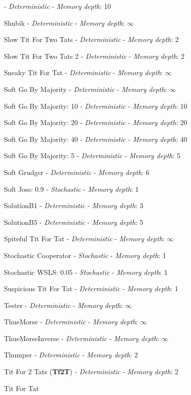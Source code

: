  - \textit{Deterministic} - \textit{Memory depth}: 10\item Shubik
 - \textit{Deterministic} - \textit{Memory depth}: \(\infty\)\item Slow Tit For Two Tats
 - \textit{Deterministic} - \textit{Memory depth}: 2\item Slow Tit For Two Tats 2
 - \textit{Deterministic} - \textit{Memory depth}: 2\item Sneaky Tit For Tat
 - \textit{Deterministic} - \textit{Memory depth}: \(\infty\)\item Soft Go By Majority
 - \textit{Deterministic} - \textit{Memory depth}: \(\infty\)\item Soft Go By Majority: 10
 - \textit{Deterministic} - \textit{Memory depth}: 10\item Soft Go By Majority: 20
 - \textit{Deterministic} - \textit{Memory depth}: 20\item Soft Go By Majority: 40
 - \textit{Deterministic} - \textit{Memory depth}: 40\item Soft Go By Majority: 5
 - \textit{Deterministic} - \textit{Memory depth}: 5\item Soft Grudger
 - \textit{Deterministic} - \textit{Memory depth}: 6\item Soft Joss: 0.9
 - \textit{Stochastic} - \textit{Memory depth}: 1\item SolutionB1
 - \textit{Deterministic} - \textit{Memory depth}: 3\item SolutionB5
 - \textit{Deterministic} - \textit{Memory depth}: 5\item Spiteful Tit For Tat
 - \textit{Deterministic} - \textit{Memory depth}: \(\infty\)\item Stochastic Cooperator
 - \textit{Stochastic} - \textit{Memory depth}: 1\item Stochastic WSLS: 0.05
 - \textit{Stochastic} - \textit{Memory depth}: 1\item Suspicious Tit For Tat
 - \textit{Deterministic} - \textit{Memory depth}: 1\item Tester
 - \textit{Deterministic} - \textit{Memory depth}: \(\infty\)\item ThueMorse
 - \textit{Deterministic} - \textit{Memory depth}: \(\infty\)\item ThueMorseInverse
 - \textit{Deterministic} - \textit{Memory depth}: \(\infty\)\item Thumper
 - \textit{Deterministic} - \textit{Memory depth}: 2\item Tit For 2 Tats
(\textbf{Tf2T}) - \textit{Deterministic} - \textit{Memory depth}: 2\item Tit For Tat
